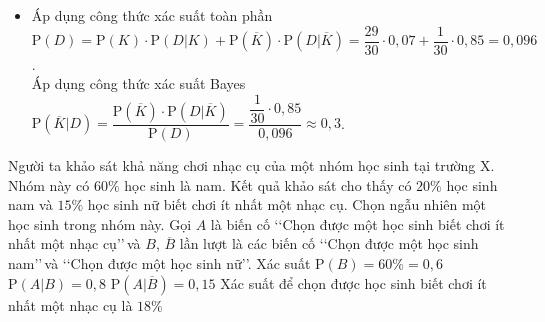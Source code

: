 \begin{bt}
{\begin{itemize}
\begin{center}
			\end{center}
			\item Áp dụng công thức xác suất toàn phần\\
			$\mathrm{P}(D)=\mathrm{P}(K)\cdot \mathrm{P}\left(D|K\right)+\mathrm{P}\left(\overline{K}\right)\cdot \mathrm{P}\left(D|\overline{K}\right)=\dfrac{29}{30}\cdot 0{,}07+\dfrac{1}{30}\cdot 0{,}85=0{,}096$.\\
			Áp dụng công thức xác suất Bayes\\
			$\mathrm{P}\left(\overline{K}|D\right)=\dfrac{\mathrm{P}\left(\overline{K}\right)\cdot \mathrm{P}\left(D|\overline{K}\right)}{\mathrm{P}(D)}=\dfrac{\dfrac{1}{30}\cdot 0{,}85}{0{,}096} \approx 0{,}3$.
		\end{itemize}
	}
\end{bt}

\begin{ex}%

	Người ta khảo sát khả năng chơi nhạc cụ của một nhóm học sinh tại trường X. Nhóm này có $60\%$ học sinh là nam. Kết quả khảo sát cho thấy có $20\%$ học sinh nam và $15\%$ học sinh nữ biết chơi ít nhất một nhạc cụ. Chọn ngẫu nhiên một học sinh trong nhóm này. Gọi $A$ là biến cố \lq\lq Chọn được một học sinh biết chơi ít nhất một nhạc cụ\rq\rq\,và $B$, $\overline{B}$ lần lượt là các biến cố \lq\lq Chọn được một học sinh nam\rq\rq\,và \lq\lq Chọn được một học sinh nữ\rq\rq. 
	\choiceTF
	{\True Xác suất $\mathrm{P}(B) = 60\% = 0{,}6$}
	{$\mathrm{P}(A|B) = 0{,}8$}
	{\True $\mathrm{P}(A|\overline{B}) = 0{,}15$}
	{\True Xác suất để chọn được học sinh biết chơi ít nhất một nhạc cụ là $18\%$}
\end{ex}

